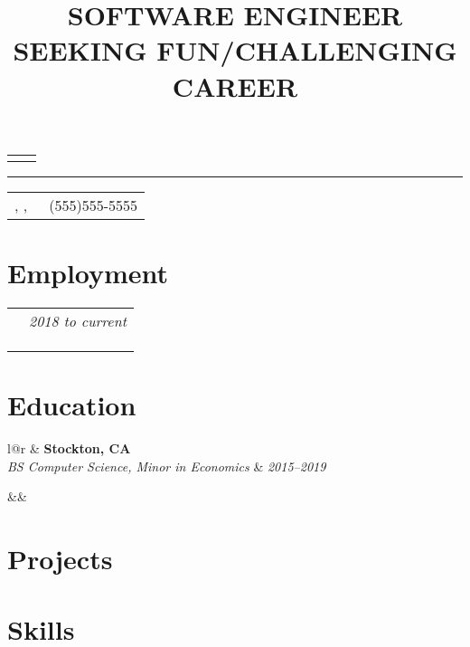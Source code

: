 \documentclass[12pt,a4paper,sans]{moderncv}
\title{SOFTWARE ENGINEER SEEKING FUN/CHALLENGING CAREER}
\makeatletter
\def\@mymobile{(555)555-5555}%
\renewcommand*{\cventry}[7][.25em]{
  \begin{tabular*}{\maincolumnwidth}{l@{\extracolsep{\fill}}r}%
    \ifboolexpr{%
      test {\ifstrempty{#4}}
      and
      test {\ifstrempty{#5}}}%
      {}%
      {\tab[1cm]{\bfseries #4} & {\bfseries #5}\\}%
    {\tab[1cm]\itshape #3\ifstrempty{#6}{}{, #6}} & {\itshape #2}\\%
  \end{tabular*}%
  \ifx&#7&%
  \else{\\%
    \begin{minipage}{\maincolumnwidth}%
      \small#7%
    \end{minipage}}\fi%
  \par\addvspace{#1}}
\newcommand*{\myjobentry}[8][.25em]{%
    \begin{tabular*}{\maincolumnwidth}{l@{\extracolsep{\fill}}r}%
      \tab[1cm]{\bfseries #3}{ $|$ }{\bfseries #4}{ $|$ }{\bfseries #5} & {\itshape #2}\\%
      \tab[1.25cm]{#6}\\%
      \tab[1.25cm]{#7}\\%
      \tab[1.25cm]{#8}\\%
    \end{tabular*}%
    \par\addvspace{#1}}
\newcommand*{\mymakeresumetitle}{%
    \begin{tabular*}{\maincolumnwidth}{l@{\extracolsep{\fill}}r}%
        \textbf{\huge\@firstname \hspace{0.5mm} \@familyname} & {\@email}%
    \end{tabular*}%
    \par\noindent\rule{\textwidth}{0.4pt}
    \begin{tabular*}{\maincolumnwidth}{l@{\extracolsep{\fill}}r}%
        \@addressstreet, \@addresscity, \@addresscountry & {\mobilephonesymbol~{\@mymobile}}%
    \end{tabular*}%
    \newline
    \newline
    \centerline{\textbf{\@title}}
    \newline

}
\newcommand\tab[1][1cm]{\hspace*{#1}}
\makeatother
\begin{document}
\mymakeresumetitle
\section{Employment}
\myjobentry{2018 to current}{DevOps Engineer}{HPE Aruba}{Roseville, CA}{Work with Yocto}{Solve bugs in large esoteric 3rd party codebase}{Support lab with debugging}

\section{Education}
\cventry{2015--2019}{BS Computer Science, Minor in Economics}{University of the Pacific}{Stockton, CA}{\textit{3.86 GPA}}{}

\section{Projects}

\section{Skills}
\end{document}
